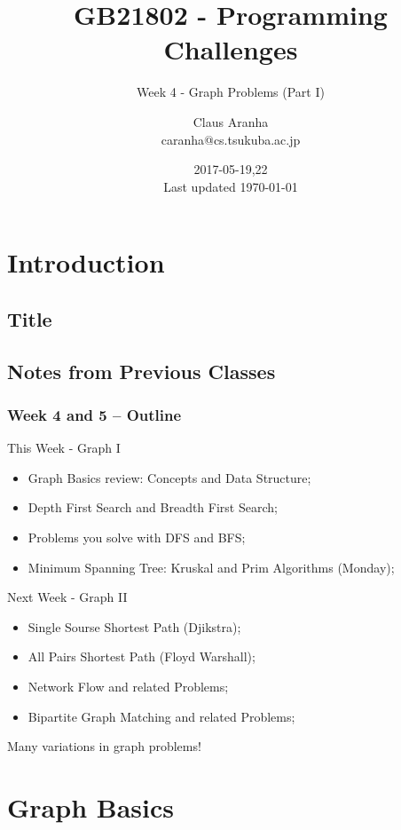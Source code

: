 \documentclass{beamer}
\title[GB21802]{GB21802 - Programming Challenges}
\subtitle[]{Week 4 - Graph Problems (Part I)}
\author[Claus Aranha]{Claus Aranha\\{\footnotesize caranha@cs.tsukuba.ac.jp}}
\institute{College of Information Science}
\date{2017-05-19,22\\{\tiny Last updated \today}}
\begin{document}
\section{Introduction}
\subsection{Title}
\begin{frame}
\maketitle
\end{frame}

\subsection{Notes from Previous Classes}



\begin{frame}
  \frametitle{Week 4 and 5 -- Outline}
  {\smaller
  \begin{block}{This Week - Graph I}
    \begin{itemize}
    \item Graph Basics review: Concepts and Data Structure;
    \item Depth First Search and Breadth First Search;
    \item Problems you solve with DFS and BFS;
    \item Minimum Spanning Tree: Kruskal and Prim Algorithms \alert{(Monday)};
    \end{itemize}
  \end{block}
  \begin{block}{Next Week - Graph II}
    \begin{itemize}
    \item Single Sourse Shortest Path (Djikstra);
    \item All Pairs Shortest Path (Floyd Warshall);   
    \item Network Flow and related Problems;
    \item Bipartite Graph Matching and related Problems;
    \end{itemize}
  \end{block}}
  Many variations in graph problems!
\end{frame}

\section{Graph Basics}
\end{document}
